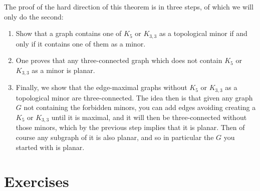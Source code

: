 \documentclass[nobib]{tufte-handout}
\begin{document}
The proof of the hard direction of this theorem is in three steps, of which we will only do the second:
\begin{enumerate}
  \item Show that a graph contains one of $K_{5}$ or $K_{3,3}$ as a topological minor if and only if it contains one of them as a minor.
  \item One proves that any three-connected graph which does not contain $K_5$ or $K_{3,3}$ as a minor is planar.
  \item Finally, we show that the edge-maximal graphs without $K_5$ or $K_{3,3}$ as a topological minor are three-connected. The idea then is that given any graph $G$ not containing the forbidden minors, you can add edges avoiding creating a $K_5$ or $K_{3,3}$ until it is maximal, and it will then be three-connected without those minors, which by the previous step implies that it is planar. Then of course any subgraph of it is also planar, and so in particular the $G$ you started with is planar.
\end{enumerate}

\section{Exercises}


%
%
\end{document}
